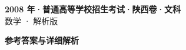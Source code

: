 \documentclass[zihao=-4, a4paper]{ctexart}
\begin{document}
\begin{center}
  {\Large\bfseries 2008 年·普通高等学校招生考试·陕西卷·文科}\\[4pt]
  {\large 数学 · 解析版}
\end{center}
\medskip
{}

\clearpage
{}
\begin{center}{\Large\bfseries 参考答案与详细解析}\end{center}
\medskip

\end{document}
